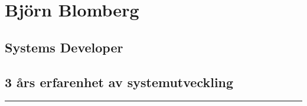 \documentclass{article}
\begin{document}
	
	\begin{minipage}[t]{0.7\textwidth}
		\titleformat{\section}{\Huge\bfseries}{\thesection}{1em}{}
		\section*{\textcolor{colorBlue}{Björn Blomberg}}
		\subsection*{\textcolor{colorTitelErfarenhet}{Systems Developer}}
		\subsection*{3 års erfarenhet av systemutveckling}
		\rule{10cm}{0.4pt}
		\titleformat{\section}{\Large\bfseries}{\thesection}{1em}{}
		\vspace{1.5cm}
	\end{minipage}%
	\begin{minipage}[t]{0.3\textwidth}
		\vspace{-10pt} %
	\end{minipage}%
	
\end{document}
